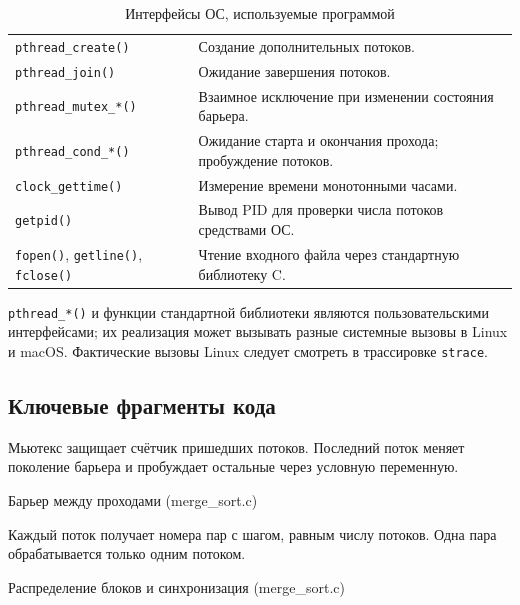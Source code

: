 \documentclass[12pt, a4paper]{article}
\begin{document}
\begin{table}[H]
  \caption{Интерфейсы ОС, используемые программой}
  \begin{tabularx}{\linewidth}{|P{5.3cm}|L|}
    \hline
     &  \\ \hline
    \texttt{pthread\_create()} & Создание дополнительных потоков. \\ \hline
    \texttt{pthread\_join()} & Ожидание завершения потоков. \\ \hline
    \texttt{pthread\_mutex\_*()} & Взаимное исключение при изменении состояния барьера. \\ \hline
    \texttt{pthread\_cond\_*()} & Ожидание старта и окончания прохода; пробуждение потоков. \\ \hline
    \texttt{clock\_gettime()} & Измерение времени монотонными часами. \\ \hline
    \texttt{getpid()} & Вывод PID для проверки числа потоков средствами ОС. \\ \hline
    \texttt{fopen()}, \texttt{getline()}, \texttt{fclose()} & Чтение входного файла через стандартную библиотеку C. \\ \hline
  \end{tabularx}
\end{table}

\texttt{pthread\_*()} и функции стандартной библиотеки являются
пользовательскими интерфейсами; их реализация может вызывать разные
системные вызовы в Linux и macOS. Фактические вызовы Linux следует
смотреть в трассировке \texttt{strace}.

\subsection{Ключевые фрагменты кода}

Мьютекс защищает счётчик пришедших потоков. Последний поток меняет
поколение барьера и пробуждает остальные через условную переменную.

\begin{listingblock}{Барьер между проходами (merge\_sort.c)}
\end{listingblock}

Каждый поток получает номера пар с шагом, равным числу потоков.
Одна пара обрабатывается только одним потоком.

\begin{listingblock}{Распределение блоков и синхронизация (merge\_sort.c)}
\end{listingblock}
\end{document}
